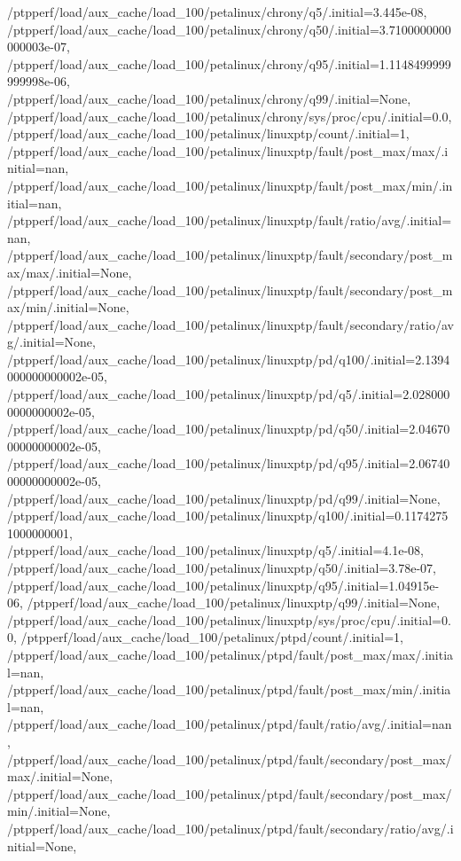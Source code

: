 {    /ptpperf/load/aux_cache/load_100/petalinux/chrony/q5/.initial=3.445e-08,
    /ptpperf/load/aux_cache/load_100/petalinux/chrony/q50/.initial=3.7100000000000003e-07,
    /ptpperf/load/aux_cache/load_100/petalinux/chrony/q95/.initial=1.1148499999999998e-06,
    /ptpperf/load/aux_cache/load_100/petalinux/chrony/q99/.initial=None,
    /ptpperf/load/aux_cache/load_100/petalinux/chrony/sys/proc/cpu/.initial=0.0,
    /ptpperf/load/aux_cache/load_100/petalinux/linuxptp/count/.initial=1,
    /ptpperf/load/aux_cache/load_100/petalinux/linuxptp/fault/post_max/max/.initial=nan,
    /ptpperf/load/aux_cache/load_100/petalinux/linuxptp/fault/post_max/min/.initial=nan,
    /ptpperf/load/aux_cache/load_100/petalinux/linuxptp/fault/ratio/avg/.initial=nan,
    /ptpperf/load/aux_cache/load_100/petalinux/linuxptp/fault/secondary/post_max/max/.initial=None,
    /ptpperf/load/aux_cache/load_100/petalinux/linuxptp/fault/secondary/post_max/min/.initial=None,
    /ptpperf/load/aux_cache/load_100/petalinux/linuxptp/fault/secondary/ratio/avg/.initial=None,
    /ptpperf/load/aux_cache/load_100/petalinux/linuxptp/pd/q100/.initial=2.1394000000000002e-05,
    /ptpperf/load/aux_cache/load_100/petalinux/linuxptp/pd/q5/.initial=2.0280000000000002e-05,
    /ptpperf/load/aux_cache/load_100/petalinux/linuxptp/pd/q50/.initial=2.0467000000000002e-05,
    /ptpperf/load/aux_cache/load_100/petalinux/linuxptp/pd/q95/.initial=2.0674000000000002e-05,
    /ptpperf/load/aux_cache/load_100/petalinux/linuxptp/pd/q99/.initial=None,
    /ptpperf/load/aux_cache/load_100/petalinux/linuxptp/q100/.initial=0.11742751000000001,
    /ptpperf/load/aux_cache/load_100/petalinux/linuxptp/q5/.initial=4.1e-08,
    /ptpperf/load/aux_cache/load_100/petalinux/linuxptp/q50/.initial=3.78e-07,
    /ptpperf/load/aux_cache/load_100/petalinux/linuxptp/q95/.initial=1.04915e-06,
    /ptpperf/load/aux_cache/load_100/petalinux/linuxptp/q99/.initial=None,
    /ptpperf/load/aux_cache/load_100/petalinux/linuxptp/sys/proc/cpu/.initial=0.0,
    /ptpperf/load/aux_cache/load_100/petalinux/ptpd/count/.initial=1,
    /ptpperf/load/aux_cache/load_100/petalinux/ptpd/fault/post_max/max/.initial=nan,
    /ptpperf/load/aux_cache/load_100/petalinux/ptpd/fault/post_max/min/.initial=nan,
    /ptpperf/load/aux_cache/load_100/petalinux/ptpd/fault/ratio/avg/.initial=nan,
    /ptpperf/load/aux_cache/load_100/petalinux/ptpd/fault/secondary/post_max/max/.initial=None,
    /ptpperf/load/aux_cache/load_100/petalinux/ptpd/fault/secondary/post_max/min/.initial=None,
    /ptpperf/load/aux_cache/load_100/petalinux/ptpd/fault/secondary/ratio/avg/.initial=None,
}
